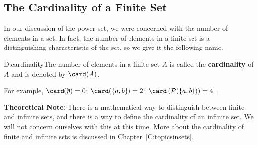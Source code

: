 \subsection*{The Cardinality of a Finite Set}
In our discussion of the power set, we were concerned with the number of elements in a set.  In fact, the number of elements in a finite set is a distinguishing characteristic of the set,  so we give it the following name. 
%
\begin{defbox}{D:cardinality}{The number of elements in a finite set  $A$ is called the \textbf{cardinality}
%
%
 of  $A$  and is denoted by  $\card(A)$.} \label{sym:finitecard}
\end{defbox}
%
\noindent
For example,  $\card (\emptyset) = 0$; \qquad	
$\card (\left\{ {a,b} \right\}) = 2$; \qquad	
$\card \left( \mathcal{P}( \left\{ {a,b} \right\}) \right) = 4$.


\begin{flushleft}
\textbf{Theoretical Note:}  There is a mathematical way to distinguish between finite and infinite sets, and there is a way to define the cardinality of an infinite set.  We will not concern ourselves with this at this time.  More about the cardinality of finite and infinite sets is discussed in Chapter~\ref{C:topicsinsets}.
\end{flushleft}

\endinput
